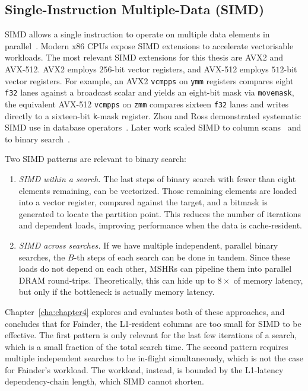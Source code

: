 \subsection{Single-Instruction Multiple-Data (SIMD)\label{sec:bg:simd}}

SIMD allows a single instruction to operate on multiple data elements in parallel~\cite{intel_intrinsics_guide}. Modern x86 CPUs expose SIMD extensions to accelerate vectorisable workloads. The most relevant SIMD extensions for this thesis are AVX2 and AVX-512. AVX2 employs $256$-bit vector registers, and AVX-512 employs $512$-bit vector registers. For example, an AVX2 \texttt{vcmpps} on \texttt{ymm} registers compares eight \texttt{f32} lanes against a broadcast scalar and yields an eight-bit mask via \texttt{movemask}, the equivalent AVX-512 \texttt{vcmpps} on \texttt{zmm} compares sixteen \texttt{f32} lanes and writes directly to a sixteen-bit \texttt{k}-mask register. Zhou and Ross demonstrated systematic SIMD use in database operators~\cite{zhou_ross_2002}. Later work scaled SIMD to column scans~\cite{willhalm_2009} and to binary search~\cite{schlegel_2009}.

Two SIMD patterns are relevant to binary search:

\begin{enumerate}
  \item \emph{SIMD within a search.}  The last steps of binary search with fewer than eight elements remaining, can be vectorized. Those remaining elements are loaded into a vector register, compared against the target, and a bitmask is generated to locate the partition point. This reduces the number of iterations and dependent loads, improving performance when the data is cache-resident.

  \item \emph{SIMD across searches.} If we have multiple independent, parallel binary searches, the $B$-th steps of each search can be done in tandem. Since these loads do not depend on each other, MSHRs can pipeline them into parallel DRAM round-trips. Theoretically, this can hide up to $8\times$ of memory latency, but only if the bottleneck is actually memory latency.
  
\end{enumerate}

Chapter~\ref{cha:chapter4} explores and evaluates both of these approaches, and concludes that for Fainder, the L1-resident columns are too small for SIMD to be effective. The first pattern is only relevant for the last few iterations of a search, which is a small fraction of the total search time. The second pattern requires multiple independent searches to be in-flight simultaneously, which is not the case for Fainder's workload. The workload, instead, is bounded by the L1-latency dependency-chain length, which SIMD cannot shorten.


